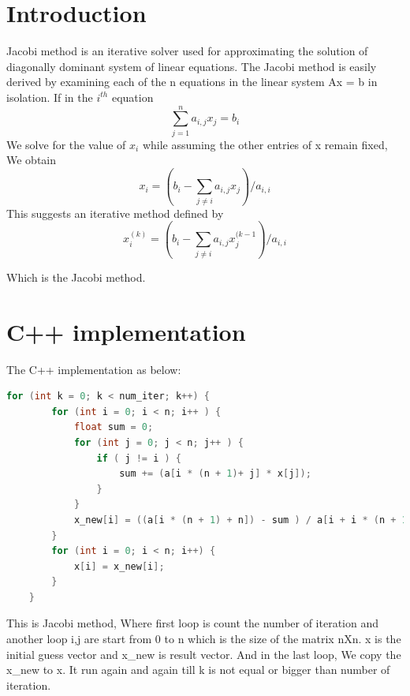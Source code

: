 \section{Introduction}
Jacobi method is an iterative solver used for approximating the solution of diagonally dominant system of linear equations. 
The Jacobi method is easily derived by examining each of the n equations in the linear system Ax = b in isolation. If in the $i^{th}$ equation \\
\begin{equation}
	\sum^n_{j=1}a_{i,j}x_j = b_i
\end{equation}
We solve for the value of $x_i$ while assuming the other entries of x remain fixed, We obtain\\
\begin{equation}
	x_i = (b_i - \sum_{j\neq i}a_{i,j}x_j)/a_{i,i}
\end{equation}
This suggests an iterative method defined by \\
\begin{equation}
	x_i^{(k)} = (b_i - \sum_{j\neq i}a_{i,j}x_j^{(k-1})/a_{i,i}
\end{equation}

Which is the Jacobi method.

\section{C++ implementation}
The C++ implementation as below:
\begin{lstlisting}[language=C, caption=Jacobi method in C++]
	for (int k = 0; k < num_iter; k++) {
		for (int i = 0; i < n; i++ ) {
			float sum = 0;
			for (int j = 0; j < n; j++ ) {
				if ( j != i ) {
					sum += (a[i * (n + 1)+ j] * x[j]);
				}
			}
            x_new[i] = ((a[i * (n + 1) + n]) - sum ) / a[i + i * (n + 1)];
        }
		for (int i = 0; i < n; i++) {
			x[i] = x_new[i];
        }
	}
\end{lstlisting}
This is Jacobi method, Where first loop is count the number of iteration and another loop i,j are start from 0 to n which is the size of the matrix nXn. x is the initial guess vector and x\_new is result vector. And in the last loop, We copy the x\_new to x. It run again and again till k is not equal or bigger than number of iteration.

